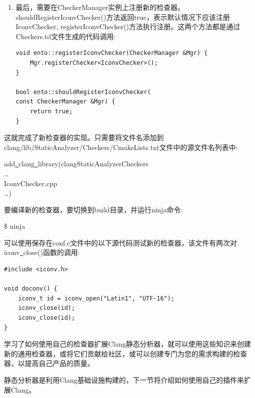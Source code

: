 \begin{enumerate}
\item 最后，需要在CheckerManager实例上注册新的检查器。shouldRegisterIconvChecker()方法返回true，表示默认情况下应该注册IconvChecker, registerIconvChecker()方法执行注册。这两个方法都是通过Checkers.td文件生成的代码调用:
\begin{lstlisting}[caption={}]
void ento::registerIconvChecker(CheckerManager &Mgr) {
	Mgr.registerChecker<IconvChecker>();
}

bool ento::shouldRegisterIconvChecker(
const CheckerManager &Mgr) {
	return true;
}
\end{lstlisting}

\end{enumerate}

这就完成了新检查器的实现。只需要将文件名添加到clang/lib/StaticAnalyzer/Checkers/CmakeLists.txt文件中的源文件名列表中:\par

\begin{tcolorbox}[colback=white,colframe=black]
add\underline{~}clang\underline{~}library(clangStaticAnalyzerCheckers \\
… \\
\hspace*{0.5cm}IconvChecker.cpp \\
…)
\end{tcolorbox}

要编译新的检查器，要切换到build目录，并运行ninja命令:\par

\begin{tcolorbox}[colback=white,colframe=black]
\$ ninja
\end{tcolorbox}

可以使用保存在conf.c文件中的以下源代码测试新的检查器，该文件有两次对iconv\underline{~}close()函数的调用:\par

\begin{lstlisting}[caption={}]
#include <iconv.h>

void doconv() {
	iconv_t id = iconv_open("Latin1", "UTF-16");
	iconv_close(id);
	iconv_close(id);
}
\end{lstlisting}

学习了如何使用自己的检查器扩展Clang静态分析器，就可以使用这些知识来创建新的通用检查器，或将它们贡献给社区，或可以创建专门为您的需求构建的检查器，以提高自己产品的质量。 \par

静态分析器是利用Clang基础设施构建的，下一节将介绍如何使用自己的插件来扩展Clang。\par















